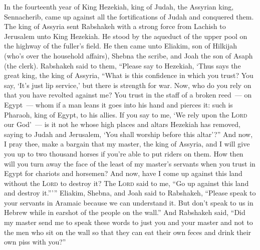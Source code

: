 
\begin{inparaenum}
   In the fourteenth year of King Hezekiah, king of Judah, the Assyrian king, Sennacherib, came up against all the fortifications of Judah and conquered them.%
   The king of Assyria sent Rabshakeh with a strong force from Lachish to Jerusalem unto King Hezekiah. He stood by the aqueduct of the upper pool on the highway of the fuller's field.%
   He then came unto Eliakim, son of Hilkijah (who's over the household affairs), Shebna the scribe, and Joah the son of Asaph (the clerk).%
   Rabshakeh said to them, ``Please say to Hezekiah, `Thus says the great king, the king of Assyria, ``What is this confidence in which you trust?%
   You say, `It's just lip service,' but there is strength for war. Now, who do you rely on that you have revolted against me?%
   You trust in the staff of a broken reed~--- on Egypt~--- whom if a man leans it goes into his hand and pierces it: such is Pharaoh, king of Egypt, to his allies.%
   If you say to me, `We rely upon the \textsc{Lord} our God'~--- is it not he whose high places and altars Hezekiah has removed, saying to Judah and Jerusalem, `You shall worship before this altar'?''%
   And now, I pray thee, make a bargain that my master, the king of Assyria, and I will give you up to two thousand horses if you're able to put riders on them.%
   How then will you turn away the face of the least of my master's servants when you trust in Egypt for chariots and horsemen?%
   And now, have I come up against this land without the \textsc{Lord} to destroy it? The \textsc{Lord} said to me, ``Go up against this land and destroy it.''\thinspace'\thinspace''%
   Eliakim, Shebna, and Joah said to Rabshakeh, ``Please speak to your servants in Aramaic because we can understand it. But don't speak to us in Hebrew while in earshot of the people on the wall.''%
   And Rabshakeh said, ``Did my master send me to speak these words to just you and your master and not to the men who sit on the wall so that they can eat their own feces and drink their own piss with you?''%

\end{inparaenum}
